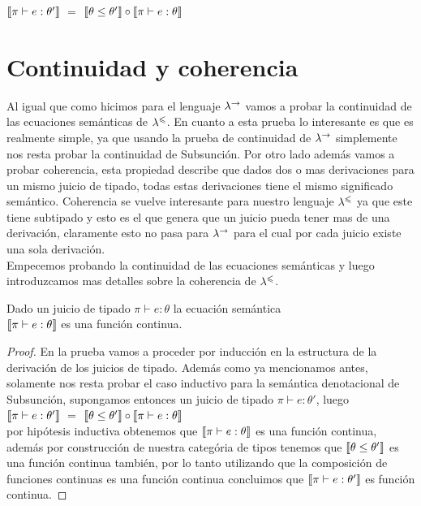 $\llbracket \pi \vdash e : \theta' \rrbracket$ $=$ $\llbracket \theta \leq \theta' \rrbracket \circ \llbracket \pi \vdash e : \theta \rrbracket$

\section{Continuidad y coherencia}

Al igual que como hicimos para el lenguaje $\lambda^{\rightarrow}$ vamos a probar la
continuidad de las ecuaciones sem\'anticas de $\lambda^{\leqslant}$. En cuanto a 
esta prueba lo interesante es que es realmente simple, ya que usando la 
prueba de continuidad de $\lambda^{\rightarrow}$ simplemente nos resta probar 
la continuidad de Subsunción. Por otro lado adem\'as vamos a probar coherencia,
esta propiedad describe que dados dos o mas derivaciones para un mismo
juicio de tipado, todas estas derivaciones tiene el mismo significado
sem\'antico. Coherencia se vuelve interesante para nuestro lenguaje $\lambda^{\leqslant}$
ya que este tiene subtipado y esto es el que genera que un juicio pueda
tener mas de una derivaci\'on, claramente esto no pasa para $\lambda^{\rightarrow}$ para
el cual por cada juicio existe una sola derivaci\'on.\\

Empecemos probando la continuidad de las ecuaciones sem\'anticas y luego
introduzcamos mas detalles sobre la coherencia de $\lambda^{\leqslant}$.

\begin{theorem}

Dado un juicio de tipado $\pi \vdash e : \theta$ la ecuaci\'on sem\'antica
\\ 
$\llbracket \pi \vdash e : \theta \rrbracket$ es una funci\'on continua.

\end{theorem}

\begin{proof}

En la prueba vamos a proceder por inducci\'on en la estructura de la derivaci\'on 
de los juicios de tipado. Adem\'as como ya mencionamos antes, solamente nos resta
probar el caso inductivo para la sem\'antica denotacional de Subsunción, supongamos
entonces un juicio de tipado $\pi \vdash e : \theta'$, luego\\

$\llbracket \pi \vdash e : \theta' \rrbracket$ $=$ $\llbracket \theta \leq \theta' \rrbracket \circ \llbracket \pi \vdash e : \theta \rrbracket$\\

por hip\'otesis inductiva obtenemos que $\llbracket \pi \vdash e : \theta \rrbracket$ es una funci\'on
continua, adem\'as por construcci\'on de nuestra categ\'oria de tipos
tenemos que $\llbracket \theta \leq \theta' \rrbracket$ es una funci\'on continua tambi\'en, 
por lo tanto utilizando que la composici\'on de funciones continuas es una funci\'on
continua concluimos que $\llbracket \pi \vdash e : \theta' \rrbracket$ es funci\'on continua.

\end{proof}


